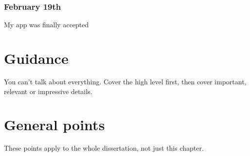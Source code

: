 \documentclass{l4proj}
\begin{document}
\subsubsection{February 19th}
My app was finally accepted
























































































\section{Guidance}
You can't talk about everything. Cover the high level first, then cover important, relevant or impressive details.


\section{General points}
These points apply to the whole dissertation, not just this chapter.
\end{document}
